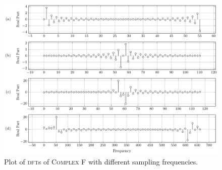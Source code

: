 \documentclass[../../course]{subfiles}
\begin{document}
\vfill

\begin{figure} [H]
    \centering
     {
        \includegraphics[height = 0.8\textheight] {tikzpics/plotDftComplexF64.pdf}
    }
     {Plot of \textsc{dft}s of \textsc{Complex F} with different sampling frequencies.}
    \label{plt:dftCplxF64}
\end{figure}

\pagebreak
\end{document}

